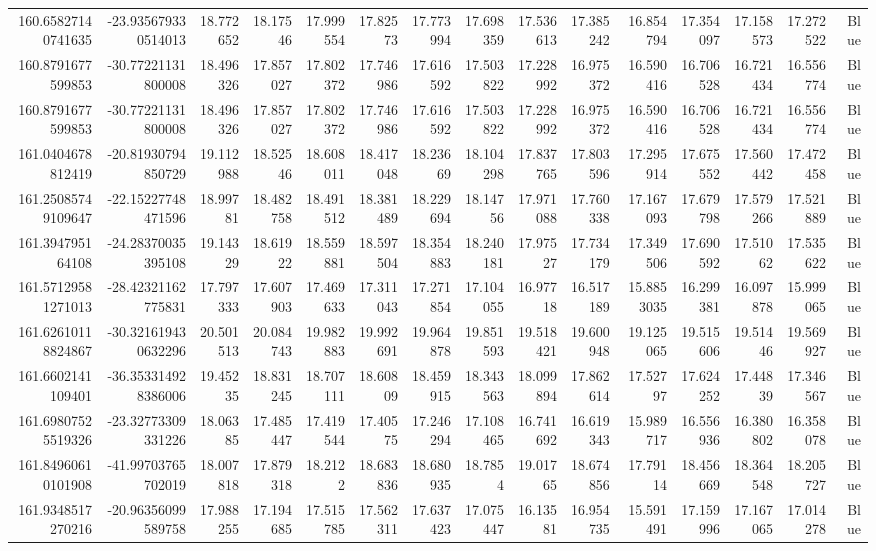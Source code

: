 \begin{center}
\begin{longtable}{rrrrrrrrrrrrrrr}
160.65827140741635 & -23.935679330514013 & 18.772652 & 18.17546 & 17.999554 & 17.82573 & 17.773994 & 17.698359 & 17.536613 & 17.385242 & 16.854794 & 17.354097 & 17.158573 & 17.272522 & Blue \\
160.8791677599853 & -30.77221131800008 & 18.496326 & 17.857027 & 17.802372 & 17.746986 & 17.616592 & 17.503822 & 17.228992 & 16.975372 & 16.590416 & 16.706528 & 16.721434 & 16.556774 & Blue \\
160.8791677599853 & -30.77221131800008 & 18.496326 & 17.857027 & 17.802372 & 17.746986 & 17.616592 & 17.503822 & 17.228992 & 16.975372 & 16.590416 & 16.706528 & 16.721434 & 16.556774 & Blue \\
161.0404678812419 & -20.81930794850729 & 19.112988 & 18.52546 & 18.608011 & 18.417048 & 18.23669 & 18.104298 & 17.837765 & 17.803596 & 17.295914 & 17.675552 & 17.560442 & 17.472458 & Blue \\
161.25085749109647 & -22.15227748471596 & 18.99781 & 18.482758 & 18.491512 & 18.381489 & 18.229694 & 18.14756 & 17.971088 & 17.760338 & 17.167093 & 17.679798 & 17.579266 & 17.521889 & Blue \\
161.394795164108 & -24.28370035395108 & 19.14329 & 18.61922 & 18.559881 & 18.597504 & 18.354883 & 18.240181 & 17.97527 & 17.734179 & 17.349506 & 17.690592 & 17.51062 & 17.535622 & Blue \\
161.57129581271013 & -28.42321162775831 & 17.797333 & 17.607903 & 17.469633 & 17.311043 & 17.271854 & 17.104055 & 16.97718 & 16.517189 & 15.8853035 & 16.299381 & 16.097878 & 15.999065 & Blue \\
161.62610118824867 & -30.321619430632296 & 20.501513 & 20.084743 & 19.982883 & 19.992691 & 19.964878 & 19.851593 & 19.518421 & 19.600948 & 19.125065 & 19.515606 & 19.51446 & 19.569927 & Blue \\
161.6602141109401 & -36.353314928386006 & 19.45235 & 18.831245 & 18.707111 & 18.60809 & 18.459915 & 18.343563 & 18.099894 & 17.862614 & 17.52797 & 17.624252 & 17.44839 & 17.346567 & Blue \\
161.69807525519326 & -23.32773309331226 & 18.06385 & 17.485447 & 17.419544 & 17.40575 & 17.246294 & 17.108465 & 16.741692 & 16.619343 & 15.989717 & 16.556936 & 16.380802 & 16.358078 & Blue \\
161.84960610101908 & -41.99703765702019 & 18.007818 & 17.879318 & 18.2122 & 18.683836 & 18.680935 & 18.7854 & 19.01765 & 18.674856 & 17.79114 & 18.456669 & 18.364548 & 18.205727 & Blue \\
161.9348517270216 & -20.96356099589758 & 17.988255 & 17.194685 & 17.515785 & 17.562311 & 17.637423 & 17.075447 & 16.13581 & 16.954735 & 15.591491 & 17.159996 & 17.167065 & 17.014278 & Blue \\

\end{longtable}
\end{center}
